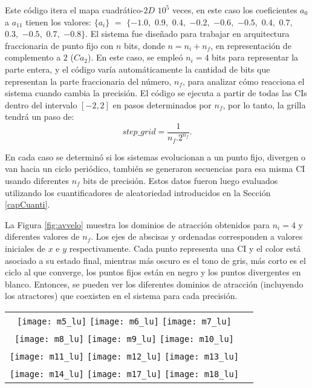Este código itera el mapa cuadrático-$2D$ $10 ^ 5$ veces, en este caso los coeficientes $a_0$ a $a_ {11}$ tienen los valores: $\{a_i \}$ $=$ $\{- 1.0,$ $0.9,$ $0.4,$ $-0.2,$ $-0.6,$ $-0.5,$ $0.4,$ $0.7,$ $0.3,$ $-0.5,$ $0.7,$ $-0.8 \}$.
El sistema fue diseñado para trabajar en arquitectura fraccionaria de punto fijo con $n$ bits, donde $n = n_i + n_f$, en representación de complemento a $2$ ($Ca_2$).
En este caso, se empleó $n_i = 4$ bits para representar la parte entera, y el código varía automáticamente la cantidad de bits que representan la parte fraccionaria del número, $n_f$, para analizar cómo reacciona el sistema cuando cambia la precisión.
El código se ejecuta a partir de todas las CIs dentro del intervalo $[-2,2]$ en pasos determinados por $n_f$, por lo tanto, la grilla tendrá un paso de:
%
\begin{equation}
step\_grid=\frac{1}{n_f.2^{n_f}}.
\end{equation}

En cada caso se determinó si los sistemas evolucionan a un punto fijo, divergen o van hacia un ciclo periódico, también se generaron secuencias para esa misma CI usando diferentes $n_f$ bits de precisión.
Estos datos fueron luego evaluados utilizando los cuantificadores de aleatoriedad introducidos en la Sección \ref{capCuanti}.

La Figura \ref{fig:avvelo} muestra los dominios de atracción obtenidos para $n_i = 4$ y diferentes valores de $n_f$.
Los ejes de abscisas y ordenadas corresponden a valores iniciales de $x$ e $y$ respectivamente.
Cada punto representa una CI y el color está asociado a su estado final, mientras más oscuro es el tono de gris, más corto es el ciclo al que converge, los puntos fijos están en negro y los puntos divergentes en blanco.
Entonces, se pueden ver los diferentes dominios de atracción (incluyendo los atractores) que coexisten en el sistema para cada precisión.
%
\begin{figure*}
	\centering
	\begin{tabular}{cc}
		\texttt{[image: m5\_lu]}
		\texttt{[image: m6\_lu]}
		\texttt{[image: m7\_lu]}\\
		\texttt{[image: m8\_lu]}
		\texttt{[image: m9\_lu]}
		\texttt{[image: m10\_lu]}\\
		\texttt{[image: m11\_lu]}
		\texttt{[image: m12\_lu]}
		\texttt{[image: m13\_lu]}\\
		\texttt{[image: m14\_lu]}
		\texttt{[image: m17\_lu]}
		\texttt{[image: m18\_lu]}\\
	\end{tabular}
	\caption{Áreas coexistentes en el dominio de atracción para: (a) $n_f=5$, (b) $n_f=6$, (c) $n_f=7$, (d) $n_f=8$, (e) $n_f=9$, (f) $n_f=10$, (g) $n_f=11$, (h) $n_f=12$, (i) $n_f=13$, (j) $n_f=14$, (k) $n_f=17$, (l) $n_f=18$.}
	\label{fig:avvelo}
\end{figure*}

